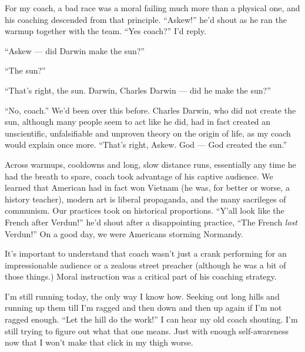\documentclass[14pt, oneside]{memoir}
\begin{document}
For my coach, a bad race was a moral failing much more than a physical
one, and his coaching descended from that principle.
``Askew!'' he'd shout as he ran the warmup together with the team.
``Yes coach?'' I'd reply.

``Askew --- did Darwin make the sun?''

``The sun?''

``That's right, the sun. Darwin, Charles Darwin --- did he make the
sun?''

``No, coach.'' We'd been over this before.
Charles Darwin, who did not create the sun, although many people seem
to act like he did, had in fact created an unscientific,
unfalsifiable and unproven theory on the origin of life,
as my coach would explain once more.
``That's right, Askew. God --- God created the sun.''

Across warmups, cooldowns and long, slow distance runs, essentially
any time he had the breath to spare, coach took advantage of his
captive audience.
We learned that American had in fact won Vietnam (he was, for better
or worse, a history teacher), modern art is liberal propaganda, and
the many sacrileges of communism.
Our practices took on historical proportions.
``Y'all look like the French after Verdun!'' he'd shout after a
disappointing practice, ``The French \textit{lost} Verdun!''
On a good day, we were Americans storming Normandy.

It's important to understand that coach wasn't just a crank performing
for an impressionable audience or a zealous street preacher (although
he was a bit of those things.)
Moral instruction was a critical part of his coaching strategy.

I'm still running today, the only way I know how.
Seeking out long hills and running up them till I'm ragged and then
down and then up again if I'm not ragged enough.
``Let the hill do the work!'' I can hear my old coach shouting.
I'm still trying to figure out what that one means.
Just with enough self-awareness now that I won't make that click in my
thigh worse.
\end{document}
